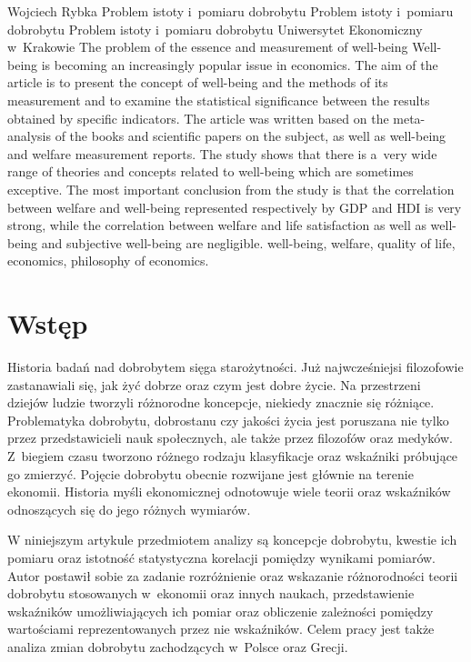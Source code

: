 \begin{artplenv}{Wojciech Rybka}
	{Problem istoty i~pomiaru dobrobytu}
	{Problem istoty i~pomiaru dobrobytu}
	{Problem istoty i~pomiaru dobrobytu}
	{Uniwersytet Ekonomiczny w~Krakowie\label{rybka-start}}
	{The problem of the essence and measurement of well-being}
	{Well-being is becoming an increasingly popular issue in economics. The aim of the article is to present the concept of well-being and the methods of its measurement and to examine the statistical significance between the results obtained by specific indicators. The article was written based on the meta-analysis of the books and scientific papers on the subject, as well as well-being and welfare measurement reports. The study shows that there is a~very wide range of theories and concepts related to well-being which are sometimes exceptive. The most important conclusion from the study is that the correlation between welfare and well-being represented respectively by GDP and HDI is very strong, while the correlation between welfare and life satisfaction as well as well-being and subjective well-being are negligible.}
	{well-being, welfare, quality of life, economics, philosophy of economics.}



\section*{Wstęp}
\lettrine[loversize=0.13,lines=2,lraise=-0.05,nindent=0em,findent=0.2pt]%
{H}{}istoria badań nad dobrobytem sięga starożytności. Już najwcześniejsi filozofowie zastanawiali się, jak żyć dobrze oraz
czym jest dobre życie. Na przestrzeni dziejów ludzie tworzyli różnorodne koncepcje, niekiedy znacznie się różniące.
Problematyka dobrobytu, dobrostanu czy jakości życia jest poruszana nie tylko przez przedstawicieli nauk społecznych,
ale także przez filozofów oraz medyków. Z~biegiem czasu tworzono różnego rodzaju klasyfikacje oraz wskaźniki próbujące
go zmierzyć. Pojęcie dobrobytu obecnie rozwijane jest głównie na terenie ekonomii. Historia myśli ekonomicznej
odnotowuje wiele teorii oraz wskaźników odnoszących się do jego różnych wymiarów.

W niniejszym artykule przedmiotem analizy są koncepcje dobrobytu, kwestie ich pomiaru oraz istotność statystyczna
korelacji pomiędzy wynikami pomiarów. Autor postawił sobie za zadanie rozróżnienie oraz wskazanie różnorodności teorii
dobrobytu stosowanych w~ekonomii oraz innych naukach, przedstawienie wskaźników umożliwiających ich pomiar oraz
obliczenie zależności pomiędzy wartościami reprezentowanych przez nie wskaźników. Celem pracy jest także analiza zmian
dobrobytu zachodzących w~Polsce oraz Grecji. 


\end{artplenv}
